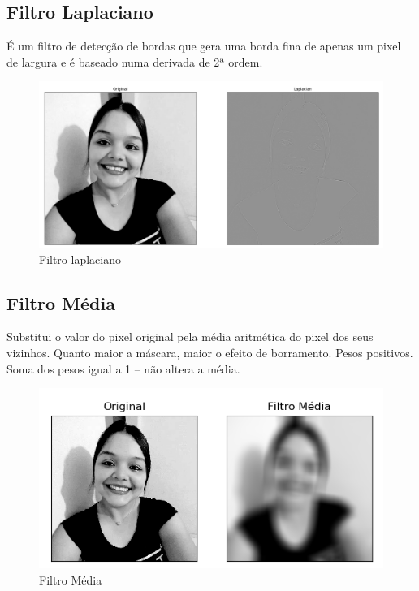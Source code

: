 		\lstset{language=c++}
		{\tiny }
		
	\subsection{Filtro Laplaciano}
		É um filtro de detecção de bordas que gera uma borda fina de apenas um pixel de largura e é baseado numa derivada de 2ª ordem.
		
		\begin{figure}[!htb]
			\centering
			\includegraphics[width=\textwidth]{img/14-laplaciano.png}
			\caption{Filtro laplaciano}
		\end{figure}
	
		\lstset{language=c++}
		{\tiny }
	
	\subsection{Filtro Média}
		Substitui o valor do pixel original pela média aritmética do pixel dos seus vizinhos. Quanto maior a máscara, maior o efeito de borramento. Pesos positivos. Soma dos pesos igual a 1 – não altera a média.
		
		\begin{figure}[!htb]
			\centering
			\includegraphics[width=\columnwidth]{img/15-media.png}
			\caption{Filtro Média}
		\end{figure}
		
